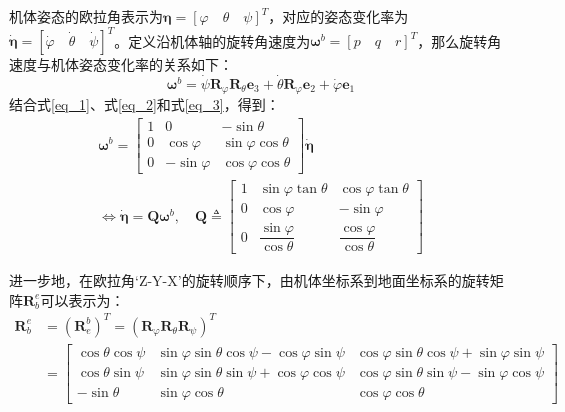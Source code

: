 机体姿态的欧拉角表示为$\boldsymbol{\eta}=[\varphi \quad \theta \quad \psi]^T$，对应的姿态变化率为$\boldsymbol{\dot{\eta}}=[\dot{\varphi} \quad \dot{\theta} \quad \dot{\psi}]^T$。定义沿机体轴的旋转角速度为$\boldsymbol{\omega}^b=[p \quad q \quad r]^T$，那么旋转角速度与机体姿态变化率的关系如下\cite{ducard2009fault}：
\begin{equation}
    \boldsymbol\omega^{b}=\dot{\psi}\boldsymbol{R}_{\varphi} \boldsymbol{R}_{\theta} \boldsymbol{e}_{3}+\dot{\theta}\boldsymbol{R}_{\varphi}\boldsymbol{e}_{2}+\dot{\varphi}\boldsymbol{e}_{1}\label{eq_3}
\end{equation}
结合式\eqref{eq_1}、式\eqref{eq_2}和式\eqref{eq_3}，得到：
\begin{equation}
    \begin{gathered}
    \boldsymbol\omega^{b}=
    \begin{bmatrix}
    1 & 0 & -\sin\theta \\
    0 & \cos\varphi & \sin\varphi\cos\theta \\
    0 & -\sin\varphi & \cos\varphi\cos\theta
    \end{bmatrix}
    \boldsymbol{\dot{\eta}}
    \\
    \Leftrightarrow\dot{\boldsymbol{\eta}}=\boldsymbol{Q}\boldsymbol{\omega}^b,\quad\boldsymbol{Q}\triangleq
    \begin{bmatrix}
        1 & \sin\varphi\tan\theta & \cos\varphi\tan\theta \\
        0 & \cos\varphi & -\sin\varphi \\
        0 & \dfrac{\sin\varphi}{\cos\theta} & \dfrac{\cos\varphi}{\cos\theta}
        \end{bmatrix}
    \label{eq_4}
    \end{gathered}
\end{equation}

进一步地，在欧拉角‘Z-Y-X’的旋转顺序下，由机体坐标系到地面坐标系的旋转矩阵$\boldsymbol{R}^e_b$可以表示为：
\begin{equation}
    \begin{aligned}
    \boldsymbol{R}_{b}^{e} & =(\boldsymbol{R}_{e}^{b})^T =(\boldsymbol{R}_\varphi\boldsymbol{R}_\theta\boldsymbol{R}_\psi)^T \\
     & =
    \begin{bmatrix}
    \cos{\theta}\cos{\psi} & \sin{\varphi}\sin{\theta}\cos{\psi}-\cos{\varphi}\sin{\psi} & \cos{\varphi}\sin{\theta}\cos{\psi} + \sin{\varphi}\sin{\psi}
    \\ 
    \cos{\theta}\sin{\psi} & \sin{\varphi}\sin{\theta}\sin{\psi} + \cos{\varphi}\cos{\psi} & \cos{\varphi}\sin{\theta}\sin{\psi} - \sin{\varphi}\cos{\psi}
    \\
    -\sin{\theta} & \sin{\varphi}\cos{\theta} & \cos{\varphi}\cos{\theta}
    \end{bmatrix}
    \label{eq_5}
    \end{aligned}
\end{equation}

